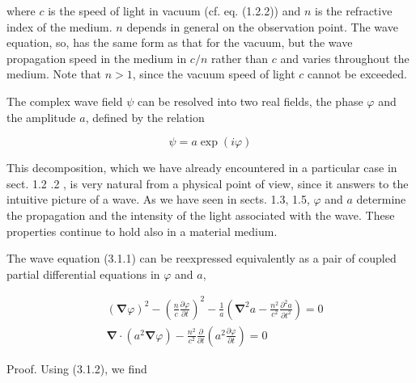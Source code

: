 \documentclass{article}
\begin{document}
where $c$ is the speed of light in vacuum (cf. eq. (1.2.2)) and $n$ is the refractive index of the medium. $n$ depends in general on the observation point. The wave equation, so, has the same form as that for the vacuum, but the wave propagation speed in the medium in $c / n$ rather than $c$ and varies throughout the medium. Note that $n>1$, since the vacuum speed of light $c$ cannot be exceeded.

The complex wave field $\psi$ can be resolved into two real fields, the phase $\varphi$ and the amplitude $a$, defined by the relation
 
\begin{equation*}
\psi=a \exp (i \varphi) \tag{3.1.2}
\end{equation*}
 

This decomposition, which we have already encountered in a particular case in sect. 1.2 .2 , is very natural from a physical point of view, since it answers to the intuitive picture of a wave. As we have seen in sects. 1.3, 1.5, $\varphi$ and $a$ determine the propagation and the intensity of the light associated with the wave. These properties continue to hold also in a material medium.

The wave equation (3.1.1) can be reexpressed equivalently as a pair of coupled partial differential equations in $\varphi$ and $a$,
 
\begin{align*}
& (\boldsymbol{\nabla} \varphi)^{2}-\left(\frac{n}{c} \frac{\partial \varphi}{\partial t}\right)^{2}-\frac{1}{a}\left(\boldsymbol{\nabla}^{2} a-\frac{n^{2}}{c^{2}} \frac{\partial^{2} a}{\partial t^{2}}\right)=0  \tag{3.1.3}\\
& \boldsymbol{\nabla} \cdot\left(a^{2} \boldsymbol{\nabla} \varphi\right)-\frac{n^{2}}{c^{2}} \frac{\partial}{\partial t}\left(a^{2} \frac{\partial \varphi}{\partial t}\right)=0 \tag{3.1.4}
\end{align*}
 

Proof. Using (3.1.2), we find
 
\end{document}
